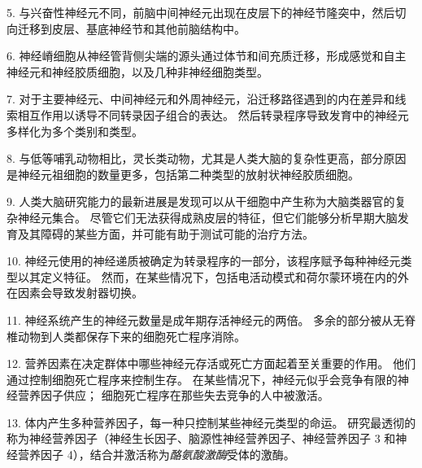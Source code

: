 5. 与兴奋性神经元不同，前脑中间神经元出现在皮层下的神经节隆突中，然后切向迁移到皮层、基底神经节和其他前脑结构中。


6. 神经嵴细胞从神经管背侧尖端的源头通过体节和间充质迁移，形成感觉和自主神经元和神经胶质细胞，以及几种非神经细胞类型。


7. 对于主要神经元、中间神经元和外周神经元，沿迁移路径遇到的内在差异和线索相互作用以诱导不同转录因子组合的表达。
然后转录程序导致发育中的神经元多样化为多个类别和类型。


8. 与低等哺乳动物相比，灵长类动物，尤其是人类大脑的复杂性更高，部分原因是神经元祖细胞的数量更多，包括第二种类型的放射状神经胶质细胞。


9. 人类大脑研究能力的最新进展是发现可以从干细胞中产生称为大脑类器官的复杂神经元集合。
尽管它们无法获得成熟皮层的特征，但它们能够分析早期大脑发育及其障碍的某些方面，并可能有助于测试可能的治疗方法。


10. 神经元使用的神经递质被确定为转录程序的一部分，该程序赋予每种神经元类型以其定义特征。
然而，在某些情况下，包括电活动模式和荷尔蒙环境在内的外在因素会导致发射器切换。


11. 神经系统产生的神经元数量是成年期存活神经元的两倍。
多余的部分被从无脊椎动物到人类都保存下来的细胞死亡程序消除。


12. 营养因素在决定群体中哪些神经元存活或死亡方面起着至关重要的作用。
他们通过控制细胞死亡程序来控制生存。
在某些情况下，神经元似乎会竞争有限的神经营养因子供应；
细胞死亡程序在那些失去竞争的人中被激活。 


13. 体内产生多种营养因子，每一种只控制某些神经元类型的命运。
研究最透彻的称为神经营养因子（神经生长因子、脑源性神经营养因子、神经营养因子 3 和神经营养因子 4），结合并激活称为\textit{酪氨酸激酶}受体的激酶。


